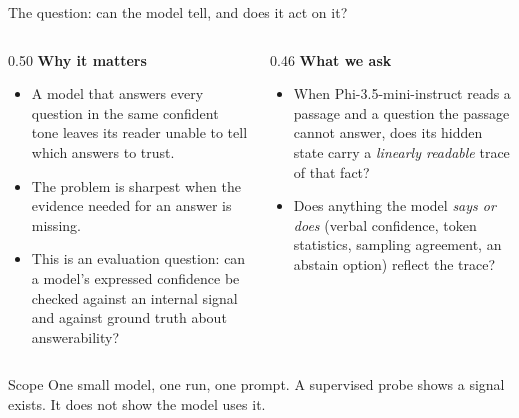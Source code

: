\documentclass[aspectratio=169,11pt,usepdftitle=false]{beamer}
\begin{document}
\begin{frame}{The question: can the model tell, and does it act on it?}
\footnotesize
\begin{columns}[T]
\begin{column}{0.50\textwidth}
\textbf{Why it matters}
\begin{itemize}
\item A model that answers every question in the same confident tone leaves its reader unable to tell which answers to trust.
\item The problem is sharpest when the evidence needed for an answer is missing.
\item This is an evaluation question: can a model's expressed confidence be checked against an internal signal and against ground truth about answerability?
\end{itemize}
\end{column}
\begin{column}{0.46\textwidth}
\textbf{What we ask}
\begin{itemize}
\item When Phi-3.5-mini-instruct reads a passage and a question the passage cannot answer, does its hidden state carry a \emph{linearly readable} trace of that fact?
\item Does anything the model \emph{says or does} (verbal confidence, token statistics, sampling agreement, an abstain option) reflect the trace?
\end{itemize}
\end{column}
\end{columns}
\begin{alertblock}{Scope}
One small model, one run, one prompt. A supervised probe shows a signal exists. It does not show the model uses it.
\end{alertblock}
\end{frame}
\end{document}
